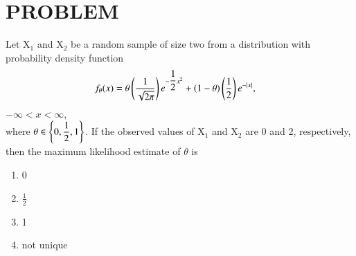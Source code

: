 \documentclass[journal,12pt,twocolumn]{IEEEtran}
\begin{document}
\section{PROBLEM}
Let X$_{1}$ and X$_{2}$ be a random sample of size two
from a distribution with probability density
function
\begin{align}
    f_{\theta}(x) &= \theta \left(\dfrac{1}{\sqrt{2\pi}}\right)e^{-\dfrac{1}{2} x^{2}} + \left(1-\theta\right)\left(\dfrac{1}{2}\right)e^{-\mid x\mid} \nonumber,
\end{align}
$-\infty<x<\infty$,\\
where  $\theta \in \left\{ 0,\dfrac{1}{2}, 1 \right\}$. If the observed values
of X$_{1}$ and X$_{2}$ are 0 and 2, respectively, then
the maximum likelihood estimate of $\theta$ is
\begin{enumerate}
    \item 0 
    \item $\frac{1}{2}$
    \item 1
    \item not unique
\end{enumerate}
\end{document}
